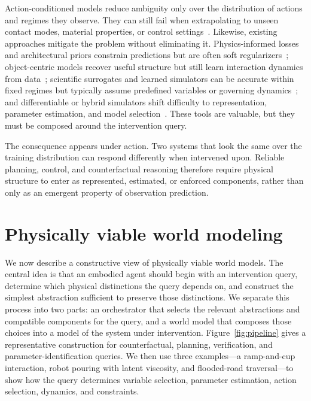 \documentclass{article}
\begin{document}
Action-conditioned models reduce ambiguity only over the distribution of actions and regimes they observe. They can still fail when extrapolating to unseen contact modes, material properties, or control settings~\cite{hafner2019learning,hafner2025mastering,gupta2022maskvit,janner2022planning,ding2024diffusion,rigter2024avid,huang2025vid2world}. Likewise, existing approaches mitigate the problem without eliminating it. Physics-informed losses and architectural priors constrain predictions but are often soft regularizers~\cite{raissi2019physics,greydanus2019hnn,cranmer2020lnn,cranmer2020discovering,beucler2021enforcing}; object-centric models recover useful structure but still learn interaction dynamics from data~\cite{kipf2020,locatello2020,liu2023ifactor}; scientific surrogates and learned simulators can be accurate within fixed regimes but typically assume predefined variables or governing dynamics~\cite{fourcastnet,graphcast,panguweather,chang2016compositional,battaglia2016interaction,li2018learning,chen2018neural,sanchezgonzalez2020learning,pfaff2020learning}; and differentiable or hybrid simulators shift difficulty to representation, parameter estimation, and model selection~\cite{difftaichi,jatavallabhula2021gradsim,brax,physgaussian,abouchakra2024,zhang2024physdreamer,huang2024dreamphysics,liu2024physflow,chen2025physgen3d,zhou2025chronodreamer}. These tools are valuable, but they must be composed around the intervention query.

The consequence appears under action. Two systems that look the same over the training distribution can respond differently when intervened upon. Reliable planning, control, and counterfactual reasoning therefore require physical structure to enter as represented, estimated, or enforced components, rather than only as an emergent property of observation prediction.



\section{Physically viable world modeling}

We now describe a constructive view of physically viable world models. The central idea is that an embodied agent should begin with an intervention query, determine which physical distinctions the query depends on, and construct the simplest abstraction sufficient to preserve those distinctions. We separate this process into two parts: an orchestrator that selects the relevant abstractions and compatible components for the query, and a world model that composes those choices into a model of the system under intervention.
Figure~\ref{fig:pipeline} gives a representative construction for counterfactual, planning, verification, and parameter-identification queries. We then use three examples—a ramp-and-cup interaction, robot pouring with latent viscosity, and flooded-road traversal—to show how the query determines variable selection, parameter estimation, action selection, dynamics, and constraints.
\end{document}
